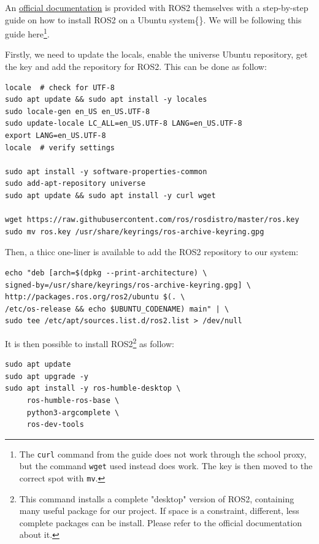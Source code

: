 \documentclass[10pt]{article}
\begin{document}
An \href{https://docs.ros.org/en/humble/Installation/Ubuntu-Install-Debians.html}{official documentation} is provided with ROS2 themselves with a step-by-step guide on how to install
ROS2 on a Ubuntu system\{\}.
We will be following this guide here\footnote{The \texttt{curl} command from the guide does not work through the school proxy,
but the command \texttt{wget} used instead does work. The key is then moved to the correct spot with \texttt{mv}.}.

Firstly, we need to update the locals, enable the universe Ubuntu repository,
get the key and add the repository for ROS2. This can be done as follow:
\begin{verbatim}
locale  # check for UTF-8
sudo apt update && sudo apt install -y locales
sudo locale-gen en_US en_US.UTF-8
sudo update-locale LC_ALL=en_US.UTF-8 LANG=en_US.UTF-8
export LANG=en_US.UTF-8
locale  # verify settings

sudo apt install -y software-properties-common
sudo add-apt-repository universe
sudo apt update && sudo apt install -y curl wget

wget https://raw.githubusercontent.com/ros/rosdistro/master/ros.key
sudo mv ros.key /usr/share/keyrings/ros-archive-keyring.gpg
\end{verbatim}

Then, a thicc one-liner is available to add the ROS2 repository to our system:
\begin{verbatim}
echo "deb [arch=$(dpkg --print-architecture) \
signed-by=/usr/share/keyrings/ros-archive-keyring.gpg] \
http://packages.ros.org/ros2/ubuntu $(. \
/etc/os-release && echo $UBUNTU_CODENAME) main" | \
sudo tee /etc/apt/sources.list.d/ros2.list > /dev/null
\end{verbatim}

It is then possible to install ROS2\footnote{This command installs a complete "desktop" version of ROS2, containing many
useful package for our project.
If space is a constraint, different, less complete packages can be install.
Please refer to the official documentation about it.} as follow:
\begin{verbatim}
sudo apt update
sudo apt upgrade -y
sudo apt install -y ros-humble-desktop \
     ros-humble-ros-base \
     python3-argcomplete \
     ros-dev-tools
\end{verbatim}
\end{document}
